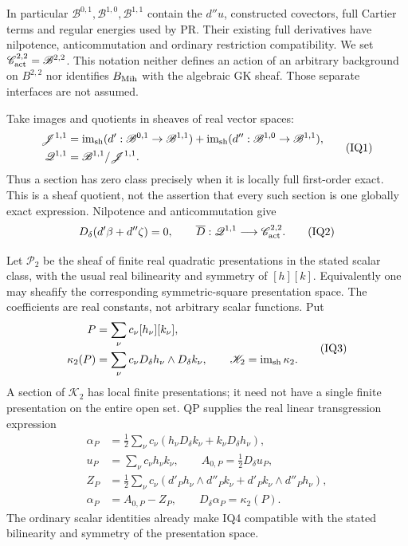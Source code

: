 In particular \(\mathscr B^{0,1},\mathscr B^{1,0},
\mathscr B^{1,1}\) contain the \(d''u\), constructed
covectors, full Cartier terms and regular energies used by PR.
Their existing full derivatives have nilpotence, anticommutation
and ordinary restriction compatibility.  We set
\(\mathscr C^{2,2}_{\rm act}=\mathscr B^{2,2}\).
This notation neither defines an action of an arbitrary background
on \(B^{2,2}\) nor identifies \(B_{\rm Mih}\) with the
algebraic GK sheaf.  Those separate interfaces are not assumed.

Take images and quotients in sheaves of real vector spaces:
\[
 \begin{split}
 \mathscr J^{1,1}
    &=\operatorname{im}_{\rm sh}
          (d':\mathscr B^{0,1}\to\mathscr B^{1,1})
      +\operatorname{im}_{\rm sh}
          (d'':\mathscr B^{1,0}\to\mathscr B^{1,1}),\\
 \mathscr Q^{1,1}&=\mathscr B^{1,1}/\mathscr J^{1,1}.
 \end{split}
\tag{IQ1}
\]
Thus a section has zero class precisely when it is locally full
first-order exact.  This is a sheaf quotient, not the assertion
that every such section is one globally exact expression.
Nilpotence and anticommutation give
\[
 D_\delta(d'\beta+d''\zeta)=0,
       \qquad
 \overline D:\mathscr Q^{1,1}\longrightarrow
                                  \mathscr C^{2,2}_{\rm act}.
\tag{IQ2}
\]

Let \(\mathscr P_2\) be the sheaf of finite real quadratic
presentations in the stated scalar class, with the usual real
bilinearity and symmetry of \([h][k]\).  Equivalently one may
sheafify the corresponding symmetric-square presentation space.
The coefficients are real constants, not arbitrary scalar functions.
Put
\[
 \begin{split}
 P&=\sum_\nu c_\nu[h_\nu][k_\nu],\\
 \kappa_2(P)&=\sum_\nu c_\nu
                          D_\delta h_\nu\wedge D_\delta k_\nu,
       \qquad
 \mathscr K_2=\operatorname{im}_{\rm sh}\kappa_2.
 \end{split}
\tag{IQ3}
\]
A section of \(\mathscr K_2\) has local finite presentations;
it need not have a single finite presentation on the entire open
set.  QP supplies the real linear transgression expression
\[
 \begin{split}
 \alpha_P&=\tfrac12\sum_\nu c_\nu
             (h_\nu D_\delta k_\nu+k_\nu D_\delta h_\nu),\\
 u_P&=\sum_\nu c_\nu h_\nu k_\nu,\qquad
 A_{0,P}=\tfrac12D_\delta u_P,\\
 Z_P&=\tfrac12\sum_\nu c_\nu
      (d'_Ph_\nu\wedge d''_Pk_\nu+
                       d'_Pk_\nu\wedge d''_Ph_\nu),\\
 \alpha_P&=A_{0,P}-Z_P,\qquad
 D_\delta\alpha_P=\kappa_2(P).
 \end{split}
\tag{IQ4}
\]
The ordinary scalar identities already make IQ4 compatible with
the stated bilinearity and symmetry of the presentation space.

